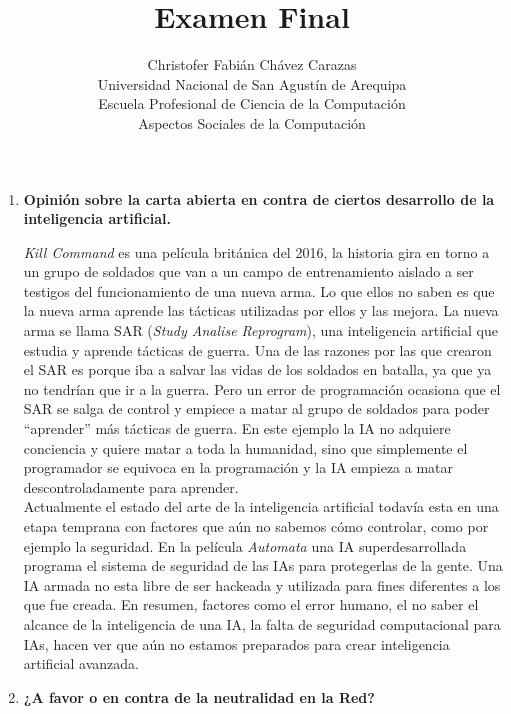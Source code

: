\documentclass[a4paper,12pt]{article}
\begin{document}
\title{Examen Final}
\author{
Christofer Fabián Chávez Carazas \\
\small{Universidad Nacional de San Agustín de Arequipa} \\
\small{Escuela Profesional de Ciencia de la Computación} \\
\small{Aspectos Sociales de la Computación}
}
\date{}

\maketitle

\begin{enumerate}
 \item \textbf{Opinión sobre la carta abierta en contra de ciertos desarrollo de la inteligencia artificial.}
 
 \textit{Kill Command} es una película británica del 2016, la historia gira en torno a un grupo de soldados que van a un campo de entrenamiento aislado a ser testigos del funcionamiento
 de una nueva arma. Lo que ellos no saben es que la nueva arma aprende las tácticas utilizadas por ellos y las mejora. La nueva arma se llama SAR (\textit{Study Analise Reprogram}),
 una inteligencia artificial que estudia y aprende tácticas de guerra. Una de las razones por las que crearon el SAR es porque iba a salvar las vidas de
 los soldados en batalla, ya que ya no tendrían que ir a la guerra. Pero un error de programación ocasiona que el SAR se salga de control y empiece a matar al grupo de
 soldados para poder ``aprender'' más tácticas de guerra. En este ejemplo la IA no adquiere conciencia y quiere matar a toda la humanidad, sino que simplemente el programador
 se equivoca en la programación y la IA empieza a matar descontroladamente para aprender. \\
 Actualmente el estado del arte de la inteligencia artificial todavía esta en una etapa temprana con factores que aún no sabemos cómo controlar, como por ejemplo la seguridad. En la película
 \textit{Automata} una IA superdesarrollada programa el sistema de seguridad de las IAs para protegerlas de la gente. Una IA armada no esta libre de ser hackeada
 y utilizada para fines diferentes a los que fue creada.
 En resumen, factores como el error humano, el no saber el alcance de la inteligencia de una IA, la falta de seguridad computacional para IAs, hacen ver que 
 aún no estamos preparados para crear inteligencia artificial avanzada.
 
 \item \textbf{¿A favor o en contra de la neutralidad en la Red?}
 

\end{enumerate}
\end{document}
